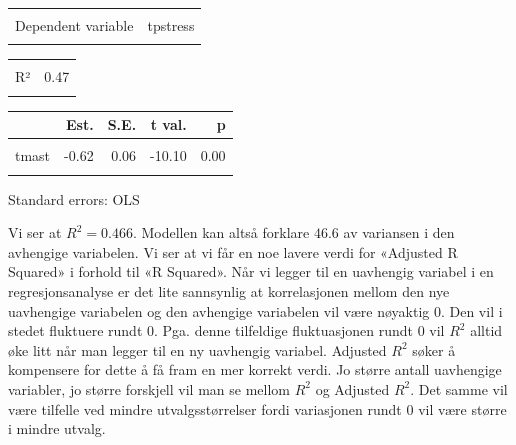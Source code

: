 \documentclass[
]{article}
\begin{document}
\begin{table}[!h]
\centering
\begin{tabular}{lr}
\toprule
\cellcolor{gray!6}{Observations} & \cellcolor{gray!6}{426}\\
Dependent variable & tpstress\\
\cellcolor{gray!6}{Type} & \cellcolor{gray!6}{OLS linear regression}\\
\bottomrule
\end{tabular}
\end{table} \begin{table}[!h]
\centering
\begin{tabular}{lr}
\toprule
\cellcolor{gray!6}{F(2,423)} & \cellcolor{gray!6}{184.49}\\
R² & 0.47\\
\cellcolor{gray!6}{Adj. R²} & \cellcolor{gray!6}{0.46}\\
\bottomrule
\end{tabular}
\end{table} \begin{table}[!h]
\centering
\begin{threeparttable}
\begin{tabular}{lrrrr}
\toprule
  & Est. & S.E. & t val. & p\\
\midrule
\cellcolor{gray!6}{(Intercept)} & \cellcolor{gray!6}{50.83} & \cellcolor{gray!6}{1.27} & \cellcolor{gray!6}{40.00} & \cellcolor{gray!6}{0.00}\\
tmast & -0.62 & 0.06 & -10.10 & 0.00\\
\cellcolor{gray!6}{tpcoiss} & \cellcolor{gray!6}{-0.17} & \cellcolor{gray!6}{0.02} & \cellcolor{gray!6}{-8.56} & \cellcolor{gray!6}{0.00}\\
\bottomrule
\end{tabular}
\begin{tablenotes}
\item Standard errors: OLS
\end{tablenotes}
\end{threeparttable}
\end{table}

Vi ser at \(R^2 = 0.466\). Modellen kan altså forklare \(46.6%
\) av variansen i den avhengige variabelen. Vi ser at vi får en noe lavere verdi for «Adjusted R Squared» i forhold til «R Squared». Når vi legger til en uavhengig variabel i en regresjonsanalyse er det lite sannsynlig at korrelasjonen mellom den nye uavhengige variabelen og den avhengige variabelen vil være nøyaktig 0. Den vil i stedet fluktuere rundt 0. Pga. denne tilfeldige fluktuasjonen rundt 0 vil \(R^2\) alltid øke litt når man legger til en ny uavhengig variabel. Adjusted \(R^2\) søker å kompensere for dette å få fram en mer korrekt verdi. Jo større antall uavhengige variabler, jo større forskjell vil man se mellom \(R^2\) og Adjusted \(R^2\). Det samme vil være tilfelle ved mindre utvalgsstørrelser fordi variasjonen rundt 0 vil være større i mindre utvalg.
\end{document}
